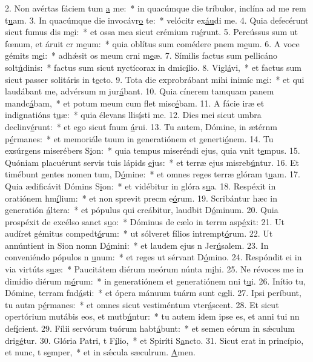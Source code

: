 2. Non avértas fáciem tum \uline{a} me:~* in quacúmque die tríbulor, inclína ad me rem t\uline{u}am.
3. In quacúmque die invocávr\uline{o} te:~* velócitr ex\uline{áu}di me.
4. Quia defecérunt sicut fumus dis m\uline{e}i:~* et ossa mea sicut crémium ru\uline{é}runt.
5. Percússus sum ut fœnum, et áruit cr m\uline{e}um:~* quia oblítus sum comédere pnem m\uline{e}um.
6. A voce gémits m\uline{e}i:~* adhǽsit os meum crni m\uline{e}æ.
7. Símilis factus sum pellicáno solt\uline{ú}dinis:~* factus sum sicut nyctícorax in dmic\uline{í}lio.
8. Vigl\uline{á}vi,~* et factus sum sicut passer solitáris in t\uline{e}cto.
9. Tota die exprobrábant mihi inimíc m\uline{e}i:~* et qui laudábant me, advérsum m jur\uline{á}bant.
10. Quia cínerem tamquam panem mandc\uline{á}bam,~* et potum meum cum flet misc\uline{é}bam.
11. A fácie iræ et indignatións t\uline{u}æ:~* quia élevans llis\uline{í}sti me.
12. Dies mei sicut umbra declinv\uline{é}runt:~* et ego sicut fnum \uline{á}rui.
13. Tu autem, Dómine, in ætérnm p\uline{é}rmanes:~* et memoriále tuum in generatiónem et generti\uline{ó}nem.
14. Tu exsúrgens miserébers S\uline{i}on:~* quia tempus miseréndi ejus, quia vnit t\uline{e}mpus.
15. Quóniam placuérunt servis tuis lápids \uline{e}jus:~* et terræ ejus misreb\uline{ú}ntur.
16. Et timébunt gentes nomen tum, D\uline{ó}mine:~* et omnes reges terræ glóram t\uline{u}am.
17. Quia ædificávit Dómins S\uline{i}on:~* et vidébitur in glóra s\uline{u}a.
18. Respéxit in oratiónem hm\uline{í}lium:~* et non sprevit precm e\uline{ó}rum.
19. Scribántur hæc in generatión \uline{á}ltera:~* et pópulus qui creábitur, laudbit D\uline{ó}minum.
20. Quia prospéxit de excélso sanct s\uline{u}o:~* Dóminus de cælo in terrm asp\uline{é}xit:
21. Ut audíret gémitus compedt\uline{ó}rum:~* ut sólveret fílios intrempt\uline{ó}rum.
22. Ut annúntient in Sion nomn D\uline{ó}mini:~* et laudem ejus n Jer\uline{ú}salem.
23. In conveniéndo pópulos n \uline{u}num:~* et reges ut sérvant D\uline{ó}mino.
24. Respóndit ei in via virtúts s\uline{u}æ:~* Paucitátem diérum meórum núnta m\uline{i}hi.
25. Ne révoces me in dimídio diérum m\uline{ó}rum:~* in generatiónem et generatiónem nni t\uline{u}i.
26. Inítio tu, Dómine, terram fnd\uline{á}sti:~* et ópera mánuum tuárm sunt c\uline{æ}li.
27. Ipsi períbunt, tu autm p\uline{é}rmanes:~* et omnes sicut vestiméntum vter\uline{á}scent.
28. Et sicut opertórium mutábis eos, et mutb\uline{ú}ntur:~* tu autem idem ipse es, et anni tui nn def\uline{í}cient.
29. Fílii servórum tuórum habt\uline{á}bunt:~* et semen eórum in sǽculum drig\uline{é}tur.
30. Glória Patri, t F\uline{í}lio,~* et Spiríti S\uline{a}ncto.
31. Sicut erat in princípio, et nunc, t s\uline{e}mper,~* et in sǽcula sæculrum. \uline{A}men.
